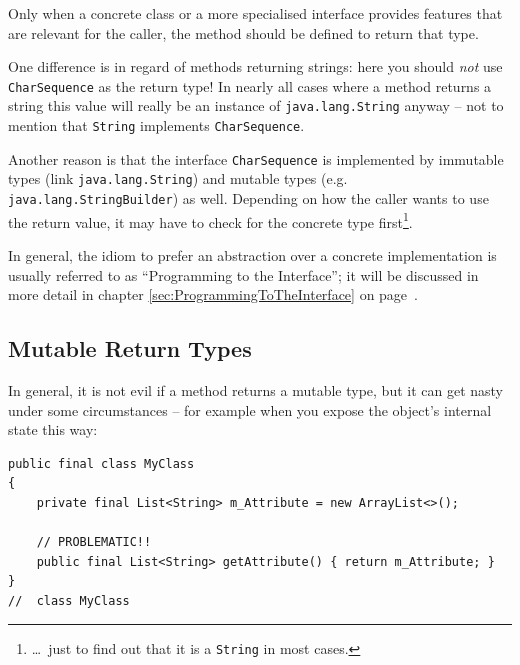 \documentclass[11pt,a4paper, titlepage, parskip=half, headsepline, footsepline, cleardoublepage=current, headheight=1cm]{scrbook}
\newcommand*{\tqvref}[1]{\hyperref[{#1}]{\ref*{#1}} on page~\pageref{#1}}
\begin{document}
Only when a concrete class or a more specialised interface provides features that are relevant for the caller, the method should be defined to return that type.

One difference is in regard of methods returning strings: here you should \textit{not} use \lstinline|CharSequence| as the return type! In nearly all cases where a method returns a string this value will really be an instance of \lstinline|java.lang.String|\autocite{ORACLE_DOC_STRING_CLASS} anyway – not to mention that \lstinline|String| implements \lstinline|CharSequence|.

Another reason is that the interface \lstinline|CharSequence| is implemented by immutable types (link \lstinline|java.lang.String|) and mutable types (e.g. \lstinline|java.lang.StringBuilder|) as well. Depending on how the caller wants to use the return value, it may have to check for the concrete type first\footnote{…~just to find out that it is a \lstinline|String| in most cases.}.

In general, the idiom to prefer an abstraction over a concrete implementation is usually referred to as “Programming to the Interface”; it will be discussed in more detail in chapter \tqvref{sec:ProgrammingToTheInterface}.


\subsection{Mutable Return Types}\label{sec:MutableReturnTypes}
In general, it is not evil if a method returns a mutable type, but it can get nasty under some circumstances – for example when you expose the object's internal state this way:
\begin{lstlisting}
public final class MyClass
{
    private final List<String> m_Attribute = new ArrayList<>();

    // PROBLEMATIC!!    
    public final List<String> getAttribute() { return m_Attribute; }
}
//  class MyClass    
\end{lstlisting}
\end{document}
